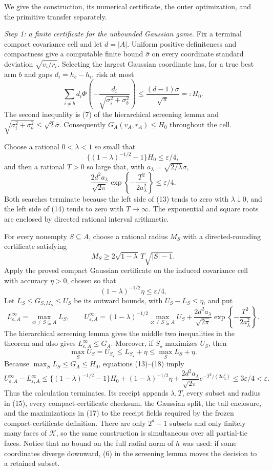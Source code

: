 We give the construction, its numerical certificate, the outer optimization, and the primitive transfer separately.

\emph{Step 1: a finite certificate for the unbounded Gaussian game.}
Fix a terminal compact covariance cell and let \(d=|A|\).  Uniform positive definiteness and compactness give a computable finite bound \(\bar\sigma\) on every coordinate standard deviation \(\sqrt{v_i/r_i}\).  Selecting the largest Gaussian coordinate has, for a true best arm \(b\) and gaps \(d_i=h_b-h_i\), risk at most
\[
\sum_{i\ne b}d_i\Phi\!\left(-\frac{d_i}{\sqrt{\sigma_i^2+\sigma_b^2}}\right)
\leq \frac{(d-1)\bar\sigma}{\sqrt\pi}=:H_0. \tag{12}
\]
The second inequality is (7) of the hierarchical screening lemma and \(\sqrt{\sigma_i^2+\sigma_b^2}\leq\sqrt2\bar\sigma\).  Consequently \(G_A(v_A,r_A)\leq H_0\) throughout the cell.

Choose a rational \(0<\lambda<1\) so small that
\[
\{(1-\lambda)^{-1/2}-1\}H_0\leq\varepsilon/4, \tag{13}
\]
and then a rational \(T>0\) so large that, with \(a_\lambda=\sqrt{2/\lambda}\bar\sigma\),
\[
\frac{2d^2a_\lambda}{\sqrt{2\pi}}
\exp\!\left\{-\frac{T^2}{2a_\lambda^2}\right\}
\leq\varepsilon/4. \tag{14}
\]
Both searches terminate because the left side of (13) tends to zero with \(\lambda\downarrow0\), and the left side of (14) tends to zero with \(T\to\infty\).  The exponential and square roots are enclosed by directed rational interval arithmetic.

For every nonempty \(S\subseteq A\), choose a rational radius \(M_S\) with a directed-rounding certificate satisfying
\[
M_S\geq2\sqrt{1-\lambda}\,T\sqrt{|S|-1}. \tag{15}
\]
Apply the proved compact Gaussian certificate on the induced covariance cell with accuracy \(\eta>0\), chosen so that
\[
(1-\lambda)^{-1/2}\eta\leq\varepsilon/4. \tag{16}
\]
Let \(L_S\leq G_{S,M_S}\leq U_S\) be its outward bounds, with \(U_S-L_S\leq\eta\), and put
\[
L^{\infty}_{\varepsilon,A}=\max_{\varnothing\ne S\subseteq A}L_S,
\qquad
U^{\infty}_{\varepsilon,A}=(1-\lambda)^{-1/2}
\max_{\varnothing\ne S\subseteq A}U_S
+\frac{2d^2a_\lambda}{\sqrt{2\pi}}
\exp\!\left\{-\frac{T^2}{2a_\lambda^2}\right\}. \tag{17}
\]
The hierarchical screening lemma gives the middle two inequalities in the theorem and also gives \(L^{\infty}_{\varepsilon,A}\leq G_A\).  Moreover, if \(S_\star\) maximizes \(U_S\), then
\[
\max_SU_S=U_{S_\star}\leq L_{S_\star}+\eta
\leq\max_SL_S+\eta. \tag{18}
\]
Because \(\max_SL_S\leq G_A\leq H_0\), equations (13)--(18) imply
\[
U^{\infty}_{\varepsilon,A}-L^{\infty}_{\varepsilon,A}
\leq\{(1-\lambda)^{-1/2}-1\}H_0
+(1-\lambda)^{-1/2}\eta
+\frac{2d^2a_\lambda}{\sqrt{2\pi}}e^{-T^2/(2a_\lambda^2)}
\leq3\varepsilon/4<\varepsilon. \tag{19}
\]
Thus the calculation terminates.  Its receipt appends \(\lambda,T\), every subset and radius in (15), every compact-certificate checksum, the Gaussian split, the tail enclosure, and the maximizations in (17) to the receipt fields required by the frozen compact-certificate definition.  There are only \(2^d-1\) subsets and only finitely many faces of \(\mathcal K\), so the same construction is simultaneous over all partial-tie faces.  Notice that no bound on the full radial norm of \(h\) was used: if some coordinates diverge downward, (6) in the screening lemma moves the decision to a retained subset.


